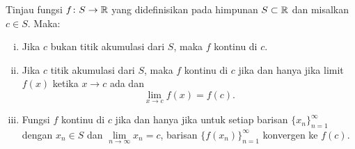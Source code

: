 \begin{prop} \label{contbasic:prop}
Tinjau fungsi $f \colon S \to {\mathbb{R}}$ yang didefinisikan pada himpunan $S \subset {\mathbb{R}}$
dan misalkan $c \in S$.
Maka:
\begin{enumerate}[(i)]
\item \label{contbasic:prop:i}
Jika $c$ bukan titik akumulasi dari $S$, maka $f$ kontinu di $c$.
\item \label{contbasic:prop:ii}
Jika $c$ titik akumulasi dari $S$, maka $f$ kontinu di $c$
jika dan hanya jika limit $f(x)$ ketika $x \to c$ ada dan
\begin{equation*}
\lim_{x\to c} f(x) = f(c) .
\end{equation*}
\item \label{contbasic:prop:iii}
Fungsi $f$ kontinu di $c$ jika dan hanya jika untuk setiap barisan
$\{ x_n \}_{n=1}^\infty$
dengan $x_n \in S$ dan $\lim\limits_{n\to\infty} x_n = c$, barisan
$\bigl\{ f(x_n) \bigr\}_{n=1}^\infty$ konvergen
ke $f(c)$.
\end{enumerate}
\end{prop}

